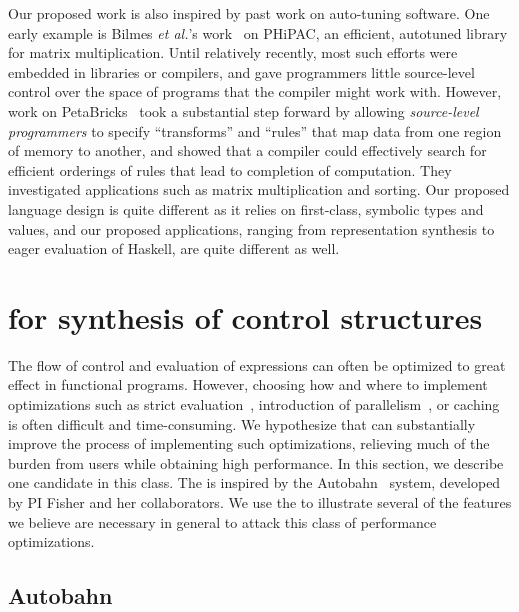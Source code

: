 Our proposed work is also inspired by past work on auto-tuning
software.  One early example is Bilmes \emph{et al.}'s 
work~\cite{Bilmes:autotune} on  PHiPAC, an efficient, autotuned library 
for matrix multiplication.  Until relatively recently, most such 
efforts were embedded
in libraries or compilers, and gave programmers little source-level
control over the space of programs that the compiler might work with.
However, work on PetaBricks~\cite{Ansel+:petabricks} took a substantial
step forward by allowing \emph{source-level programmers} to specify 
``transforms'' and ``rules'' that map data from one region of
memory to another, and showed that a compiler could effectively search
for efficient orderings of rules that lead to completion of computation.
They investigated applications such as matrix
multiplication and sorting.  Our proposed language design is quite
different as it relies on first-class, symbolic types and values,
and our proposed applications, ranging from representation synthesis
to eager evaluation of Haskell, are quite different as well.


\section{\rasps for synthesis of control structures}

The flow of control and evaluation of expressions can often be
optimized to great effect in functional programs.  However, choosing
how and where to implement optimizations such as strict
evaluation~\cite{autobahn}, introduction of
parallelism~\cite{implicit-parallel}, or caching is often difficult
and time-consuming.  We hypothesize that \rasps can substantially
improve the process of implementing such optimizations, relieving much
of the burden from \rasp users while obtaining high performance.  In
this section, we describe one candidate \rasp in this class.
The \rasp is inspired by the
Autobahn~\cite{autobahn} system, developed by PI Fisher and her
collaborators.  We use the \rasp to illustrate several of the features
we believe are necessary in general to attack this class of performance
optimizations.

\subsection{Autobahn}

